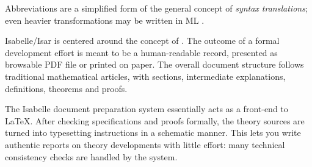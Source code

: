 \begin{isabellebody}
\begin{isamarkuptext}
Abbreviations are a simplified form of the general concept of
\emph{syntax translations}; even heavier transformations may be
written in ML \cite{isabelle-ref}.%
\end{isamarkuptext}%
\isamarkuptrue%
%
\isamarkuptrue%
%
\begin{isamarkuptext}%
Isabelle/Isar is centered around the concept of .  The outcome of a formal
  development effort is meant to be a human-readable record, presented
  as browsable PDF file or printed on paper.  The overall document
  structure follows traditional mathematical articles, with sections,
  intermediate explanations, definitions, theorems and proofs.

  \medskip The Isabelle document preparation system essentially acts
  as a front-end to {\LaTeX}.  After checking specifications and
  proofs formally, the theory sources are turned into typesetting
  instructions in a schematic manner.  This lets you write authentic
  reports on theory developments with little effort: many technical
  consistency checks are handled by the system.


\end{isamarkuptext}
\end{isabellebody}
